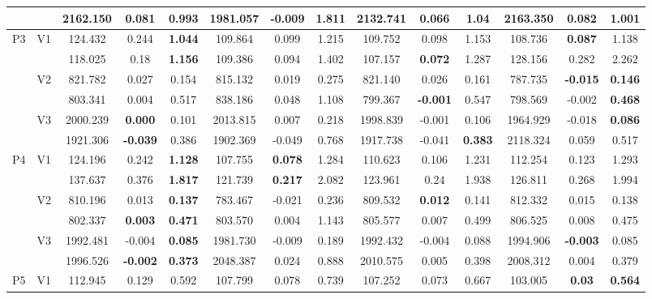 \documentclass[12pt,a4paper]{article}
\begin{document}
\begin{sidewaystable}[ht]
{\begin{tabular}{cc|ccc|ccc|ccc|ccc|}
   &  & 2162.150 & 0.081 & \textbf{0.993} & 1981.057 & \textbf{-0.009} & 1.811 & 2132.741 & 0.066 & 1.04 & 2163.350 & 0.082 & 1.001 \\ 
   \hline \hline\multirow{6}{*}{P3} & \multirow{2}{*}{V1} & 124.432 & 0.244 & \textbf{1.044} & 109.864 & 0.099 & 1.215 & 109.752 & 0.098 & 1.153 & 108.736 & \textbf{0.087} & 1.138 \\ 
   &  & 118.025 & 0.18 & \textbf{1.156} & 109.386 & 0.094 & 1.402 & 107.157 & \textbf{0.072} & 1.287 & 128.156 & 0.282 & 2.262 \\ 
   & \multirow{2}{*}{V2} & 821.782 & 0.027 & 0.154 & 815.132 & 0.019 & 0.275 & 821.140 & 0.026 & 0.161 & 787.735 & \textbf{-0.015} & \textbf{0.146} \\ 
   &  & 803.341 & 0.004 & 0.517 & 838.186 & 0.048 & 1.108 & 799.367 & \textbf{-0.001} & 0.547 & 798.569 & -0.002 & \textbf{0.468} \\ 
   & \multirow{2}{*}{V3} & 2000.239 & \textbf{0.000} & 0.101 & 2013.815 & 0.007 & 0.218 & 1998.839 & -0.001 & 0.106 & 1964.929 & -0.018 & \textbf{0.086} \\ 
   &  & 1921.306 & \textbf{-0.039} & 0.386 & 1902.369 & -0.049 & 0.768 & 1917.738 & -0.041 & \textbf{0.383} & 2118.324 & 0.059 & 0.517 \\ 
   \hline \hline\multirow{6}{*}{P4} & \multirow{2}{*}{V1} & 124.196 & 0.242 & \textbf{1.128} & 107.755 & \textbf{0.078} & 1.284 & 110.623 & 0.106 & 1.231 & 112.254 & 0.123 & 1.293 \\ 
   &  & 137.637 & 0.376 & \textbf{1.817} & 121.739 & \textbf{0.217} & 2.082 & 123.961 & 0.24 & 1.938 & 126.811 & 0.268 & 1.994 \\ 
   & \multirow{2}{*}{V2} & 810.196 & 0.013 & \textbf{0.137} & 783.467 & -0.021 & 0.236 & 809.532 & \textbf{0.012} & 0.141 & 812.332 & 0.015 & 0.138 \\ 
   &  & 802.337 & \textbf{0.003} & \textbf{0.471} & 803.570 & 0.004 & 1.143 & 805.577 & 0.007 & 0.499 & 806.525 & 0.008 & 0.475 \\ 
   & \multirow{2}{*}{V3} & 1992.481 & -0.004 & \textbf{0.085} & 1981.730 & -0.009 & 0.189 & 1992.432 & -0.004 & 0.088 & 1994.906 & \textbf{-0.003} & 0.085 \\ 
   &  & 1996.526 & \textbf{-0.002} & \textbf{0.373} & 2048.387 & 0.024 & 0.888 & 2010.575 & 0.005 & 0.398 & 2008.312 & 0.004 & 0.379 \\ 
   \hline \hline\multirow{6}{*}{P5} & \multirow{2}{*}{V1} & 112.945 & 0.129 & 0.592 & 107.799 & 0.078 & 0.739 & 107.252 & 0.073 & 0.667 & 103.005 & \textbf{0.03} & \textbf{0.564} \\ 

\end{tabular}}
\end{sidewaystable}
\end{document}
